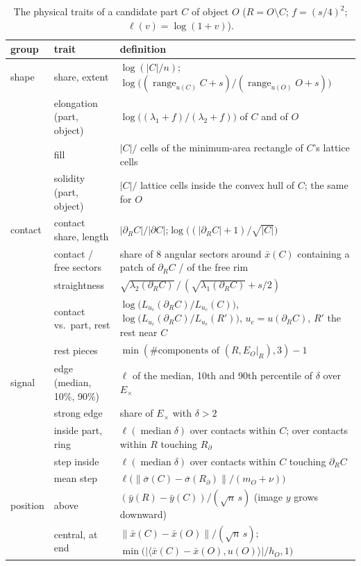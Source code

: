 \documentclass[10pt]{article}
\DeclareMathOperator*{\median}{median}
\DeclareMathOperator{\range}{range}
\begin{document}
\begin{table}[t]
\centering\small
\caption{The \nTraits{} physical traits of a candidate part $C$ of object $O$ ($R=O\setminus C$; $f=(s/4)^2$; $\ell(v)=\log(1+v)$).}
\label{tab:traits}
\begin{tabularx}{\linewidth}{@{}l l X@{}}
\toprule
group & trait & definition \\
\midrule
shape & share, extent & $\log(|C|/n)$;\quad $\log\big((\range_{u(C)}C+s)/(\range_{u(O)}O+s)\big)$\\
 & elongation (part, object) & $\log\big((\lambda_1+f)/(\lambda_2+f)\big)$ of $C$ and of $O$\\
 & fill & $|C|/$ cells of the minimum-area rectangle of $C$'s lattice cells\\
 & solidity (part, object) & $|C|/$ lattice cells inside the convex hull of $C$; the same for $O$\\
\midrule
contact & contact share, length & $|\partial_RC|/|\partial C|$;\quad $\log\big((|\partial_RC|+1)/\sqrt{|C|}\big)$\\
 & contact / free sectors & share of 8 angular sectors around $\bar x(C)$ containing a patch of $\partial_RC$ / of the free rim\\
 & straightness & $\sqrt{\lambda_2(\partial_RC)}\,/\,(\sqrt{\lambda_1(\partial_RC)}+s/2)$\\
 & contact vs.\ part, rest & $\log\big(L_{u_c}(\partial_RC)/L_{u_c}(C)\big)$, $\log\big(L_{u_c}(\partial_RC)/L_{u_c}(R')\big)$, $u_c=u(\partial_RC)$, $R'$ the rest near $C$\\
 & rest pieces & $\min(\#\text{components of }(R,E_O|_R),3)-1$\\
\midrule
signal & edge (median, 10\%, 90\%) & $\ell$ of the median, 10th and 90th percentile of $\delta$ over $E_\times$\\
 & strong edge & share of $E_\times$ with $\delta>2$\\
 & inside part, ring & $\ell(\median\delta)$ over contacts within $C$; over contacts within $R$ touching $R_\partial$\\
 & step inside & $\ell(\median\delta)$ over contacts within $C$ touching $\partial_RC$\\
 & mean step & $\ell\big(\lVert\overline{\sigma}(C)-\overline{\sigma}(R_\partial)\rVert/(m_O+\nu)\big)$\\
\midrule
position & above & $(\bar y(R)-\bar y(C))/(\sqrt n\,s)$ \quad (image $y$ grows downward)\\
 & central, at end & $\lVert\bar x(C)-\bar x(O)\rVert/(\sqrt n\,s)$;\quad $\min\big(|\langle\bar x(C)-\bar x(O),u(O)\rangle|/h_O,1\big)$\\
\bottomrule
\end{tabularx}
\end{table}
\end{document}
